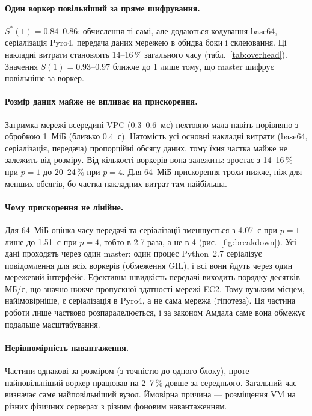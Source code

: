 \documentclass[a4paper,12pt]{article}
\begin{document}
\paragraph{Один воркер повільніший за пряме шифрування.} $S^*(1) = 0.84$--$0.86$:
обчислення ті самі, але додаються кодування base64, серіалізація Pyro4, передача даних
мережею в обидва боки і склеювання. Ці накладні витрати становлять 14--16\,\% загального
часу (табл.~\ref{tab:overhead}). Значення $S(1) = 0.93$--$0.97$ ближче до 1 лише тому, що
master шифрує повільніше за воркер.

\paragraph{Розмір даних майже не впливає на прискорення.} Затримка мережі
всередині VPC (0.3--0.6~мс) нехтовно мала навіть порівняно з обробкою 1~МіБ
(близько 0.4~с). Натомість усі основні накладні витрати (base64, серіалізація,
передача) пропорційні обсягу даних, тому їхня частка майже не залежить від
розміру. Від кількості воркерів вона залежить: зростає з 14--16\,\% при $p=1$ до
20--24\,\% при $p=4$. Для 64~МіБ прискорення трохи нижче, ніж для менших
обсягів, бо частка накладних витрат там найбільша.

\paragraph{Чому прискорення не лінійне.} Для 64~МіБ оцінка часу передачі та
серіалізації зменшується з 4.07~с при $p=1$ лише до 1.51~с при $p=4$, тобто в 2.7 раза,
а не в 4 (рис.~\ref{fig:breakdown}). Усі дані проходять через один master: один процес
Python~2.7 серіалізує повідомлення для всіх воркерів (обмеження GIL), і всі вони йдуть
через один мережевий інтерфейс. Ефективна швидкість передачі виходить порядку десятків
МБ/с, що значно нижче пропускної здатності мережі EC2. Тому вузьким місцем, найімовірніше,
є серіалізація в Pyro4, а не сама мережа (гіпотеза). Ця частина роботи лише частково
розпаралелюється, і за законом Амдала саме вона обмежує подальше масштабування.

\paragraph{Нерівномірність навантаження.} Частини однакові за розміром (з точністю
до одного блоку), проте найповільніший воркер працював на 2--7\,\% довше за
середнього. Загальний час визначає саме найповільніший вузол. Ймовірна причина ---
розміщення VM на різних фізичних серверах з різним фоновим навантаженням.
\end{document}
